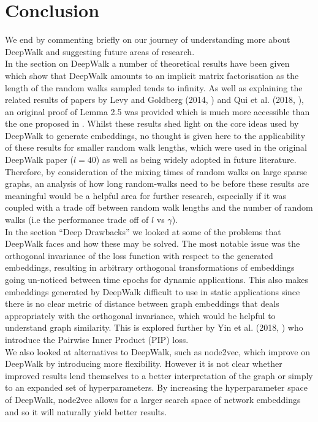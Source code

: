 \documentclass[a4paper]{article}
\begin{document}
\section{Conclusion}
We end by commenting briefly on our journey of understanding more about DeepWalk and suggesting future areas of research.\\
In the section on DeepWalk a number of theoretical results have been given which show that DeepWalk amounts to an implicit matrix factorisation as the length of the random walks sampled tends to infinity.
As well as explaining the related results of papers by Levy and Goldberg (2014, \cite{levy&goldberg}) and  Qui et al. (2018, \cite{qiu2018}), an original proof of Lemma 2.5 was provided which is much more accessible than the one proposed in \cite{qiu2018}.
Whilst these results shed light on the core ideas used by DeepWalk to generate embeddings, no thought is given here to the applicability of these results for smaller random walk lengths, which were used in the original DeepWalk paper ($l = 40$) as well as being widely adopted in future literature. Therefore, by consideration of the mixing times of random walks on large sparse graphs, an analysis of how long random-walks need to be before these
results are meaningful would be a helpful area for further research, especially if it was coupled with a trade off between random walk lengths and the number of random walks (i.e the performance trade off of $l$ vs $\gamma$).\\
In the section ``Deep Drawbacks'' we looked at some of the problems that DeepWalk faces and how these may be solved. The most notable issue was the orthogonal invariance of the loss function with respect to the generated embeddings, resulting in arbitrary orthogonal transformations of embeddings going un-noticed
between time epochs for dynamic applications. This also makes embeddings generated by DeepWalk difficult to use in static applications since there is no clear metric of distance between graph embeddings that deals appropriately with the orthogonal invariance, which would be helpful to understand graph similarity. This is explored further by Yin et al. (2018, \cite{yin2018}) who introduce the Pairwise Inner Product (PIP) loss.\\
We also looked at alternatives to DeepWalk, such as node2vec, which improve on DeepWalk by introducing more flexibility. However it is not clear whether improved results lend themselves to a better interpretation of the graph or simply to an expanded set of hyperparameters. By increasing the hyperparameter space of DeepWalk, node2vec allows for a larger search space of network embeddings and so it will naturally yield better results.
\end{document}
